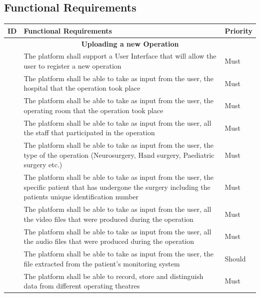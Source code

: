\subsection{Functional Requirements}
\label{sub:functional_req}

\newcommand\rownumber{\stepcounter{magicrownumbers}\arabic{magicrownumbers}}
{
\footnotesize
\begin{longtable}{|p{0.5cm}|p{13cm}p{1.3cm}|}

\rowcolor[HTML]{000000}
{\color[HTML]{FFFFFF} \textbf{ID}} & {\color[HTML]{FFFFFF} \textbf{Functional Requirements}}  & {\color[HTML]{FFFFFF} \textbf{Priority}} \\ \hline \endhead
\multicolumn{3}{|c|}{\textbf{Uploading a new Operation}} \\ \hline
\rownumber & The platform shall support a User Interface that will allow the user to register a new operation &Must  \\ \hline
\rownumber & The platform shall be able to take as input from the user, the hospital that the operation took place &Must  \\ \hline
\rownumber & The platform shall be able to take as input from the user, the operating room that the operation took place &Must  \\ \hline
\rownumber & The platform shall be able to take as input from the user, all the staff that participated in the operation &Must  \\ \hline
\rownumber & The platform shall be able to take as input from the user, the type of the operation (Neurosurgery, Hand surgery, Paediatric surgery etc.) &Must  \\ \hline
\rownumber & The platform shall be able to take as input from the user, the specific patient that has undergone the surgery including the patients unique identification number &Must  \\ \hline
\rownumber & The platform shall be able to take as input from the user, all the video files that were produced during the operation &Must  \\ \hline
\rownumber & The platform shall be able to take as input from the user, all the audio files that were produced during the operation &Must  \\ \hline
\rownumber & The platform shall be able to take as input from the user, the file extracted from the patient's monitoring system &Should  \\ \hline
\rownumber & The platform shall be able to record, store and distinguish data from different operating theatres &Must  \\ \hline

\end{longtable}}
